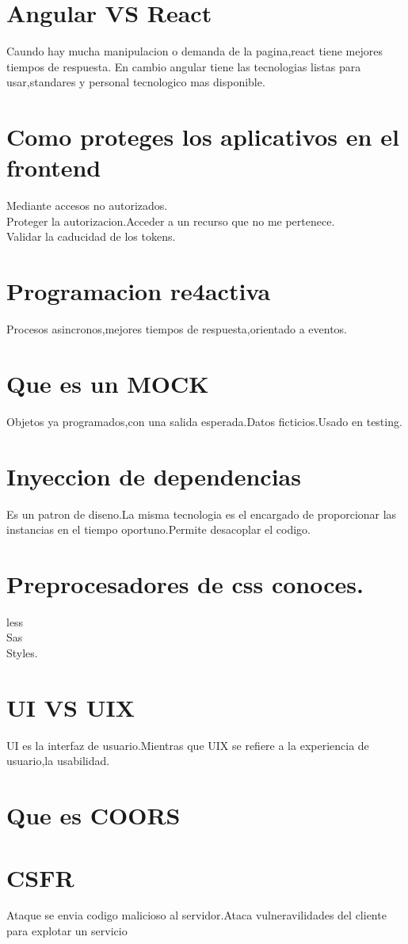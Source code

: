 \section{Angular VS React}
Caundo hay mucha manipulacion o demanda de la pagina,react tiene mejores tiempos de respuesta.
En cambio angular tiene las tecnologias listas para usar,standares y personal tecnologico mas
disponible.
\section{Como proteges los aplicativos en el frontend}
Mediante accesos no autorizados.\\
Proteger la autorizacion.Acceder a un recurso que no me pertenece.\\
Validar la caducidad de los tokens.
\section{Programacion re4activa}
Procesos asincronos,mejores tiempos de respuesta,orientado a eventos.
\section{Que es un MOCK}
Objetos ya programados,con una salida esperada.Datos ficticios.Usado en testing.
\section{Inyeccion de dependencias}
Es un patron de diseno.La misma tecnologia es el encargado de proporcionar las instancias  en el tiempo oportuno.Permite desacoplar el codigo.
\section{Preprocesadores de css conoces.}
less\\
Sas\\
Styles.
\section{UI VS UIX}
UI es la interfaz de usuario.Mientras que UIX se refiere a la experiencia de usuario,la usabilidad.
\section{Que es COORS}

\section{CSFR}
Ataque se envia codigo malicioso al servidor.Ataca vulneravilidades del cliente para explotar un servicio
